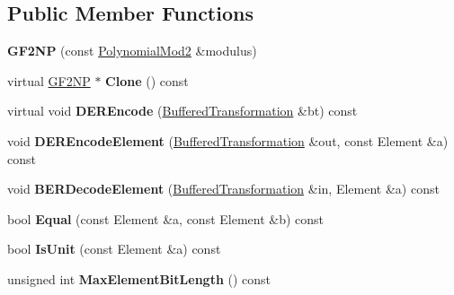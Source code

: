 \subsection*{Public Member Functions}
\begin{DoxyCompactItemize}
\item 
\hypertarget{class_g_f2_n_p_a17c7806095a9fa5ed8da633cc166a3f2}{
{\bfseries GF2NP} (const \hyperlink{class_polynomial_mod2}{PolynomialMod2} \&modulus)}
\label{class_g_f2_n_p_a17c7806095a9fa5ed8da633cc166a3f2}

\item 
\hypertarget{class_g_f2_n_p_aa7bdb8cf98bfc95e88eb10405e5ad16f}{
virtual \hyperlink{class_g_f2_n_p}{GF2NP} $\ast$ {\bfseries Clone} () const }
\label{class_g_f2_n_p_aa7bdb8cf98bfc95e88eb10405e5ad16f}

\item 
\hypertarget{class_g_f2_n_p_ac29895f70ffbceeaa3f9460cdaae3685}{
virtual void {\bfseries DEREncode} (\hyperlink{class_buffered_transformation}{BufferedTransformation} \&bt) const }
\label{class_g_f2_n_p_ac29895f70ffbceeaa3f9460cdaae3685}

\item 
\hypertarget{class_g_f2_n_p_a50111212053796f53b1b35b4678b1ede}{
void {\bfseries DEREncodeElement} (\hyperlink{class_buffered_transformation}{BufferedTransformation} \&out, const Element \&a) const }
\label{class_g_f2_n_p_a50111212053796f53b1b35b4678b1ede}

\item 
\hypertarget{class_g_f2_n_p_ae673a1ae624ac618c3d8d413620ed81c}{
void {\bfseries BERDecodeElement} (\hyperlink{class_buffered_transformation}{BufferedTransformation} \&in, Element \&a) const }
\label{class_g_f2_n_p_ae673a1ae624ac618c3d8d413620ed81c}

\item 
\hypertarget{class_g_f2_n_p_ae4767ac33544de4fbc449d3bbe17715e}{
bool {\bfseries Equal} (const Element \&a, const Element \&b) const }
\label{class_g_f2_n_p_ae4767ac33544de4fbc449d3bbe17715e}

\item 
\hypertarget{class_g_f2_n_p_a4eb48ee2cd703818c84d531308e47546}{
bool {\bfseries IsUnit} (const Element \&a) const }
\label{class_g_f2_n_p_a4eb48ee2cd703818c84d531308e47546}

\item 
\hypertarget{class_g_f2_n_p_a97725ab6dd770b220e9f67d1b1c0e8d1}{
unsigned int {\bfseries MaxElementBitLength} () const }
\label{class_g_f2_n_p_a97725ab6dd770b220e9f67d1b1c0e8d1}


\end{DoxyCompactItemize}
